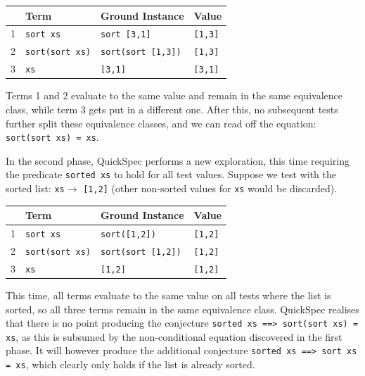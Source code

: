 \begin{tabularx}{\textwidth}{l  X  X  X}
 & Term & Ground Instance & Value \\
 \hline
1 \quad &\texttt{sort xs} & \texttt{sort [3,1]} & \texttt{[1,3]} \\
2 \quad&\texttt{sort(sort xs)} &\texttt{sort(sort [1,3])} & \texttt{[1,3]}\\  %
3 \quad &\texttt{xs} &\texttt{[3,1]} & \texttt{[3,1]} \\
\end{tabularx}

\noindent Terms 1 and 2 evaluate to the same value and remain in the same equivalence class, while term 3 gets put in a different one. After this, no subsequent tests further split these equivalence classes, and we can read off the equation: \texttt{sort(sort xs) = xs}.  %

In the second phase, QuickSpec performs a new exploration, this time requiring the predicate \texttt{sorted xs} to hold for all test values. Suppose we test with the sorted list: \texttt{xs}$ \rightarrow$ \texttt{[1,2]} (other non-sorted values for \texttt{xs} would be discarded).       

\begin{tabularx}{\textwidth}{l  X  X  X}
 & Term & Ground Instance & Value \\
 \hline
1 \quad &\texttt{sort xs} & \texttt{sort([1,2])} & \texttt{[1,2]} \\
2 \quad&\texttt{sort(sort xs)} &\texttt{sort(sort [1,2])} & \texttt{[1,2]}\\
3 \quad &\texttt{xs} &\texttt{[1,2]} & \texttt{[1,2]} \\
\end{tabularx}

\noindent This time, all terms evaluate to the same value on all tests where the list is sorted, so all three terms remain in the same equivalence class. QuickSpec realises that there is no point producing the conjecture \texttt{sorted xs ==> sort(sort xs) = xs}, as this is subsumed by the non-conditional equation discovered in the first phase. It will however produce the additional conjecture \texttt{sorted xs ==> sort xs = xs}, which clearly only holds if the list is already sorted.


